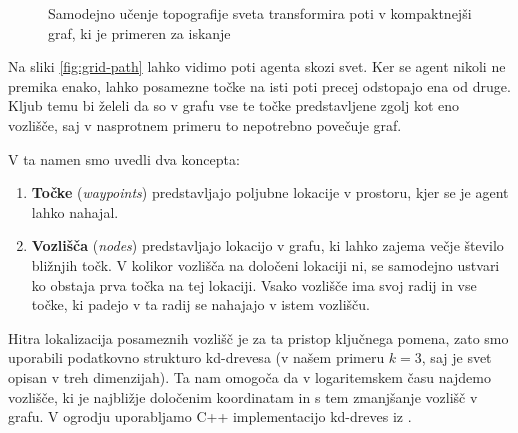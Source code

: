 \documentclass[a4paper,10pt]{article}
\begin{document}
\begin{figure}[h]
 \centering
 \caption{Samodejno učenje topografije sveta transformira poti v kompaktnejši graf, ki je primeren za iskanje}
 \label{fig:grid}
\end{figure}

\noindent
Na sliki \ref{fig:grid-path} lahko vidimo poti agenta skozi svet. Ker se agent nikoli ne premika enako, lahko posamezne točke na isti poti precej odstopajo ena od druge. Kljub temu bi želeli da so v grafu vse te točke predstavljene zgolj kot eno vozlišče, saj v nasprotnem primeru to nepotrebno povečuje graf.

V ta namen smo uvedli dva koncepta:
\begin{enumerate}
  \item \textbf{Točke} (\textit{waypoints}) predstavljajo poljubne lokacije v prostoru, kjer se je agent lahko nahajal.
  
  \item \textbf{Vozlišča} (\textit{nodes}) predstavljajo lokacijo v grafu, ki lahko zajema večje število bližnjih točk. V kolikor vozlišča na določeni lokaciji ni, se samodejno ustvari ko obstaja prva točka na tej lokaciji. Vsako vozlišče ima svoj radij in vse točke, ki padejo v ta radij se nahajajo v istem vozlišču.
\end{enumerate}

Hitra lokalizacija posameznih vozlišč je za ta pristop ključnega pomena, zato smo uporabili podatkovno strukturo kd-drevesa (v našem primeru $k = 3$, saj je svet opisan v treh dimenzijah). Ta nam omogoča da v logaritemskem času najdemo vozlišče, ki je najbližje določenim koordinatam in s tem zmanjšanje vozlišč v grafu. V ogrodju uporabljamo C++ implementacijo kd-dreves iz \cite{harris08}.
\end{document}
